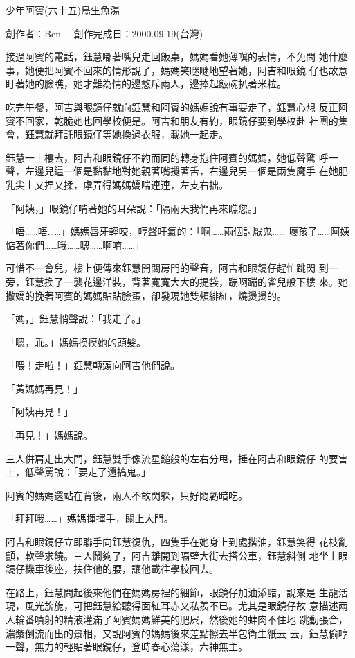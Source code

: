 



少年阿賓(六十五)鳥生魚湯

創作者：Ben　
創作完成日：2000.09.19(台灣)


接過阿賓的電話，鈺慧嘟著嘴兒走回飯桌，媽媽看她薄嗔的表情，不免問
她什麼事，她便把阿賓不回來的情形說了，媽媽笑瞇瞇地望著她，阿吉和眼鏡
仔也故意盯著她的臉瞧，她才難為情的邊憨斥兩人，邊捧起飯碗扒著米粒。

吃完午餐，阿吉與眼鏡仔就向鈺慧和阿賓的媽媽說有事要走了，鈺慧心想
反正阿賓不回家，乾脆她也回學校便是。阿吉和朋友有約，眼鏡仔要到學校赴
社團的集會，鈺慧就拜託眼鏡仔等她換過衣服，載她一起走。

鈺慧一上樓去，阿吉和眼鏡仔不約而同的轉身抱住阿賓的媽媽，她低聲驚
呼一聲，左邊兒這一個是黏黏地對她親著嘴攪著舌，右邊兒另一個是兩隻魔手
在她肥乳尖上又捏又揉，虖弄得媽媽嬌喘連連，左支右拙。

「阿姨，」眼鏡仔啃著她的耳朵說：「隔兩天我們再來瞧您。」

「唔……唔……」媽媽唇牙輕咬，哼聲吁氣的：「啊……兩個討厭鬼……
壞孩子……阿姨惦著你們……哦……嗯……啊唷……」

可惜不一會兒，樓上便傳來鈺慧開關房門的聲音，阿吉和眼鏡仔趕忙跳閃
到一旁，鈺慧換了一襲花邊洋裝，背著寬寬大大的提袋，蹦啊蹦的雀兒般下樓
來。她撒嬌的挽著阿賓的媽媽貼貼臉蛋，卻發現她雙頰緋紅，燒燙燙的。

「媽，」鈺慧悄聲說：「我走了。」

「嗯，乖。」媽媽摸摸她的頭髮。

「喂！走啦！」鈺慧轉頭向阿吉他們說。

「黃媽媽再見！」

「阿姨再見！」

「再見！」媽媽說。

三人併肩走出大門，鈺慧雙手像流星鎚般的左右分甩，捶在阿吉和眼鏡仔
的要害上，低聲罵說：「要走了還搞鬼。」

阿賓的媽媽還站在背後，兩人不敢閃躲，只好悶虧暗吃。

「拜拜哦……」媽媽揮揮手，關上大門。

阿吉和眼鏡仔立即聯手向鈺慧復仇，四隻手在她身上到處揩油，鈺慧笑得
花枝亂顫，軟聲求饒。三人鬧夠了，阿吉離開到隔壁大街去搭公車，鈺慧斜側
地坐上眼鏡仔機車後座，扶住他的腰，讓他載往學校回去。

在路上，鈺慧問起後來他們在媽媽房裡的細節，眼鏡仔加油添醋，說來是
生龍活現，風光旂旎，可把鈺慧給聽得面紅耳赤又私羨不已。尤其是眼鏡仔故
意描述兩人輪番噴射的精液灌滿了阿賓媽媽鮮美的肥屄，然後她的蚌肉不住地
跳動張合，濃漿倒流而出的景相，又說阿賓的媽媽後來差點擦去半包衛生紙云
云，鈺慧偷哼一聲，無力的輕貼著眼鏡仔，登時春心蕩漾，六神無主。

